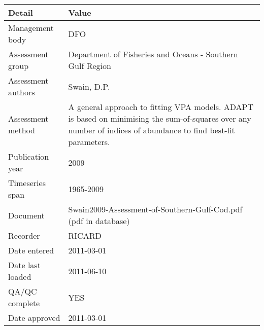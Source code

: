 \begin{table}[htb]
\centering
\begin{tabular}{lp{7cm}}
\toprule
Detail & Value \\
\midrule
Management body    & DFO                                                                                                                                                            \\
Assessment group   & Department of Fisheries and Oceans - Southern Gulf Region                                                                                                      \\
Assessment authors & Swain, D.P.                                                                                                                                                    \\
Assessment method  & A general approach to fitting VPA models. ADAPT is based on minimising the sum-of-squares over any number of indices of abundance to find best-fit parameters. \\
Publication year   & 2009                                                                                                                                                           \\
Timeseries span    & 1965-2009                                                                                                                                                      \\
Document           & Swain2009-Assessment-of-Southern-Gulf-Cod.pdf (pdf in database)                                                                                                \\
Recorder           & RICARD                                                                                                                                                         \\
Date entered       & 2011-03-01                                                                                                                                                     \\
Date last loaded   & 2011-06-10                                                                                                                                                     \\
QA/QC complete     & YES                                                                                                                                                            \\
Date approved      & 2011-03-01                                                                                                                                                     \\
\bottomrule
\end{tabular}
\label{tab:assessdet}
\end{table}
